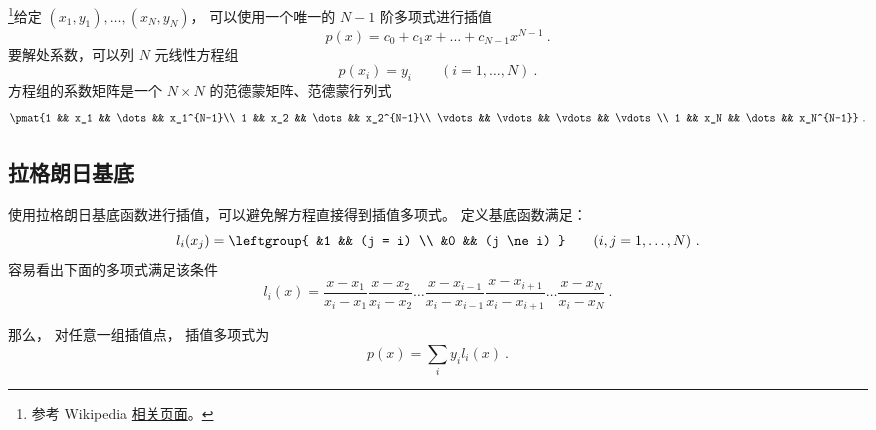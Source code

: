

\footnote{参考 Wikipedia \href{https://en.wikipedia.org/wiki/Lagrange_polynomial}{相关页面}。}给定 $(x_1, y_1), \dots, (x_N, y_N)$， 可以使用一个唯一的 $N-1$ 阶多项式进行插值
\begin{equation}
p(x) = c_0 + c_1x + \dots + c_{N-1}x^{N-1}~.
\end{equation}
要解处系数，可以列 $N$ 元线性方程组
\begin{equation}
p(x_i) = y_i \qquad (i=1,\dots,N)~.
\end{equation}
方程组的系数矩阵是一个 $N\times N$ 的范德蒙矩阵、范德蒙行列式
\begin{equation}
\pmat{1 && x_1 && \dots && x_1^{N-1}\\
1 && x_2 && \dots && x_2^{N-1}\\
\vdots && \vdots && \vdots && \vdots \\
1 && x_N && \dots && x_N^{N-1}}~.
\end{equation}

\subsection{拉格朗日基底}
使用拉格朗日基底函数进行插值，可以避免解方程直接得到插值多项式。 定义基底函数满足：
\begin{equation}
l_i(x_j) = \leftgroup{
&1 && (j = i) \\
&0 && (j \ne i)
} \qquad (i,j=1,\dots,N)~.
\end{equation}
容易看出下面的多项式满足该条件
\begin{equation}
l_i(x) = \frac{x-x_1}{x_i-x_1} \frac{x-x_2}{x_i-x_2}  \dots \frac{x-x_{i-1}}{x_i-x_{i-1}}\frac{x-x_{i+1}}{x_i-x_{i+1}} \dots \frac{x-x_N}{x_i-x_N}~.
\end{equation}

那么， 对任意一组插值点， 插值多项式为
\begin{equation}
p(x) = \sum_i y_i l_i(x)~.
\end{equation}
